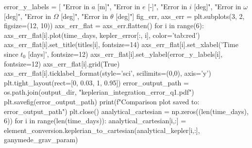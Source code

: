 {}
\markdownRendererSectionEnd \markdownRendererSectionBegin
{}\markdownRendererInterblockSeparator
{}error_y_labels = [ "Error in $a$ [m]", "Error in $e$ [-]", "Error in $i$ [deg]", "Error in $\omega$ [deg]", "Error in $\Omega$ [deg]", "Error in $\theta$ [deg]"]\markdownRendererInterblockSeparator
{}
\markdownRendererSectionEnd \markdownRendererSectionBegin
{}\markdownRendererInterblockSeparator
{}fig_err, axs_err = plt.subplots(3, 2, figsize=(12, 10))\markdownRendererInterblockSeparator
{}
\markdownRendererSectionEnd \markdownRendererSectionBegin
{}\markdownRendererInterblockSeparator
{}axs_err_flat = axs_err.flatten() for i in range(6): axs_err_flat[i].plot(time_days, kepler_error[:, i], color='tab:red') axs_err_flat[i].set_title(titles[i], fontsize=14) axs_err_flat[i].set_xlabel('Time since $t_0$ [days]', fontsize=12) axs_err_flat[i].set_ylabel(error_y_labels[i], fontsize=12) axs_err_flat[i].grid(True)\markdownRendererInterblockSeparator
{}
\markdownRendererSectionEnd \markdownRendererSectionBegin
{}\markdownRendererInterblockSeparator
{}axs_err_flat[i].ticklabel_format(style='sci', scilimits=(0,0), axis='y')\markdownRendererInterblockSeparator
{}
\markdownRendererSectionEnd \markdownRendererSectionBegin
{}\markdownRendererInterblockSeparator
{}plt.tight_layout(rect=[0, 0.03, 1, 0.95])\markdownRendererInterblockSeparator
{}
\markdownRendererSectionEnd \markdownRendererSectionBegin
{}\markdownRendererInterblockSeparator
{}error_output_path = os.path.join(output_dir, "keplerian_integration_error_q1.pdf") plt.savefig(error_output_path) print(f"Comparison plot saved to: {error_output_path}") plt.close()\markdownRendererInterblockSeparator
{}
\markdownRendererSectionEnd \markdownRendererSectionBegin
{}\markdownRendererInterblockSeparator
{}
\markdownRendererSectionEnd \markdownRendererSectionBegin
{}\markdownRendererInterblockSeparator
{}analytical_cartesian = np.zeros((len(time_days), 6)) for i in range(len(time_days)): analytical_cartesian[i,:] = element_conversion.keplerian_to_cartesian(analytical_kepler[i,:], ganymede_grav_param)\markdownRendererInterblockSeparator
